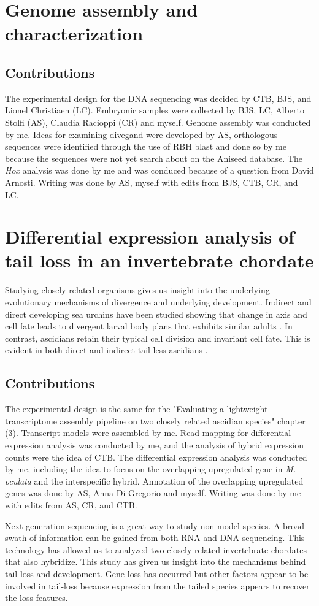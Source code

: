 \section{Genome assembly and characterization}
\subsection{Contributions}
The experimental design for the DNA sequencing was decided by CTB, BJS, and Lionel Christiaen (LC). Embryonic samples were collected by BJS, LC, Alberto Stolfi (AS), Claudia Racioppi (CR) and myself. Genome assembly was conducted by me. Ideas for examining divegand were developed by AS, orthologous sequences were identified through the use of RBH blast and done so by me because the sequences were not yet search about on the Aniseed database. The \textit{Hox} analysis was done by me and was conduced because of a question from David Arnosti. Writing was done by AS, myself with edits from BJS, CTB, CR, and LC.

\section{Differential expression analysis of tail loss in an invertebrate chordate}
Studying closely related organisms gives us insight into the underlying evolutionary mechanisms of divergence and underlying development. Indirect and direct developing sea urchins have been studied showing that change in axis and cell fate leads to divergent larval body plans that exhibits similar adults \cite{}. In contrast, ascidians retain their typical cell division and invariant cell fate. This is evident in both direct and indirect tail-less ascidians \cite{}. 
\subsection{Contributions}
The experimental design is the same for the "Evaluating a lightweight transcriptome assembly pipeline on two closely related ascidian species" chapter (3). Transcript models were assembled by me. Read mapping for differential expression analysis was conducted by me, and the analysis of hybrid expression counts were the idea of CTB. The differential expression analysis was conducted by me, including the idea to focus on the overlapping upregulated gene in \textit{M. oculata} and the interspecific hybrid. Annotation of the overlapping upregulated genes was done by AS, Anna Di Gregorio and myself. Writing was done by me with edits from AS, CR, and CTB.
  
Next generation sequencing is a great way to study non-model species. A broad swath of information can be gained from both RNA and DNA sequencing. This technology has allowed us to analyzed two closely related invertebrate chordates that also hybridize. This study has given us insight into the mechanisms behind tail-loss and development. Gene loss has occurred but other factors appear to be involved in tail-loss because expression from the tailed species appears to recover the loss features. 
